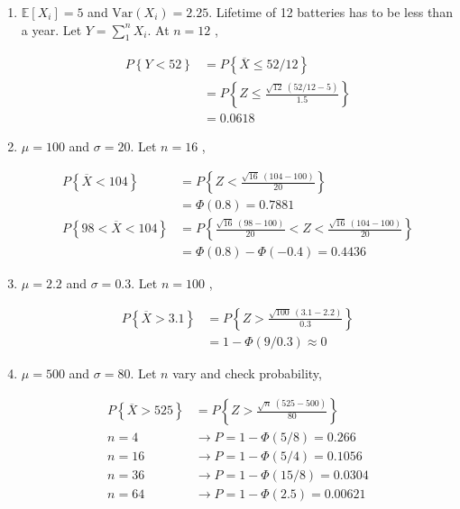 \begin{enumerate}
	
	\item $ \mathbb{E}[X_i] = 5 $ and $ \mathrm{Var}(X_i) = 2.25 $. Lifetime of 12 batteries has to be less than a year.
	Let $ Y = \sum^n_1 X_i $. At $ n = 12 $ ,
	
		\begin{align}
			P \left\{Y < 52 \right\} &= P \left\{ \overline{X} \leq 52/12 \right\} \nonumber \\
			&= P \left\{ Z \leq \frac{\sqrt{12}\ (52/12 - 5)}{1.5} \right\} \nonumber \\
			&= 0.0618 \nonumber 
		\end{align}
	
	
	\item $ \mu = 100 $ and $ \sigma = 20 $. Let $ n = 16 $ ,
	
		\begin{align}
			P \left\{\overline{X} < 104 \right\} &= P \left\{ Z < \frac{\sqrt{16}\ (104 - 100)}{20} \right\} \nonumber \\
			&= \Phi (0.8) = 0.7881 \\
			P \left\{98 < \overline{X} < 104 \right\} &= P \left\{ \frac{\sqrt{16}\ (98 - 100)}{20} < Z < \frac{\sqrt{16}\ (104 - 100)}{20} \right\} \nonumber \\
			&= \Phi (0.8) - \Phi(-0.4) = 0.4436
		\end{align}
	
	
	\item $ \mu = 2.2 $ and $ \sigma = 0.3 $. Let $ n = 100 $ ,
	
		\begin{align}
			P \left\{\overline{X} > 3.1 \right\} &= P \left\{ Z > \frac{\sqrt{100}\ (3.1 - 2.2)}{0.3} \right\} \nonumber \\
			&= 1 - \Phi (9/0.3) \approx 0  
		\end{align}
	
	
	\item $ \mu = 500 $ and $ \sigma = 80 $. Let $ n $ vary and check probability,
	
		\begin{align}
			P \left\{\overline{X} > 525 \right\} &= P \left\{ Z > \frac{\sqrt{n}\ (525 - 500)}{80} \right\} \\
			n = 4 &\to P = 1 - \Phi(5/8) = 0.266 \nonumber \\
			n = 16 &\to P = 1 - \Phi(5/4) = 0.1056 \nonumber \\
			n = 36 &\to P = 1 - \Phi(15/8) = 0.0304 \nonumber \\
			n = 64 &\to P = 1 - \Phi(2.5) = 0.00621 \nonumber 
		\end{align}
	

\end{enumerate}
